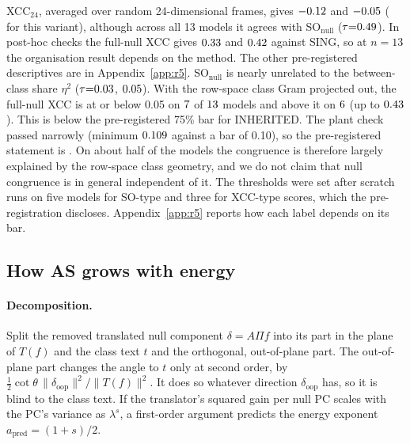 \documentclass[10pt]{article}
\begin{document}
XCC$_{24}$, averaged over random 24-dimensional frames, gives $-0.12$ and $-0.05$ (\FXCCLabel{} for this variant), although across all 13 models it agrees with SO$_{\mathrm{null}}$ ($\tau{=}0.49$). In post-hoc checks the full-null XCC gives $0.33$ and $0.42$ against SING, so at $n{=}13$ the organisation result depends on the method. The other pre-registered descriptives are in Appendix~\ref{app:r5}. SO$_{\mathrm{null}}$ is nearly unrelated to the between-class share $\eta^2$ ($\tau{=}0.03$, $0.05$). With the row-space class Gram projected out, the full-null XCC is at or below 0.05 on $7$ of $13$ models and above it on $6$ (up to $0.43$). This is below the pre-registered 75\% bar for INHERITED. The plant check passed narrowly (minimum $0.109$ against a bar of 0.10), so the pre-registered statement is \FInhStatement. On about half of the models the congruence is therefore largely explained by the row-space class geometry, and we do not claim that null congruence is in general independent of it.
The thresholds were set after scratch runs on five models for SO-type and three for XCC-type scores, which the pre-registration discloses. Appendix~\ref{app:r5} reports how each label depends on its bar.

\subsection{How AS grows with energy}
\label{sec:geom}\label{app:geom}
\paragraph{Decomposition.} Split the removed translated null component $\delta=A\Pi f$ into its part in the plane of $T(f)$ and the class text $t$ and the orthogonal, out-of-plane part.
The out-of-plane part changes the angle to $t$ only at second order, by $\tfrac12\cot\theta\,\|\delta_{\mathrm{oop}}\|^2/\|T(f)\|^2$. It does so whatever direction $\delta_{\mathrm{oop}}$ has, so it is blind to the class text.
If the translator's squared gain per null PC scales with the PC's variance as $\lambda^{s}$, a first-order argument predicts the energy exponent $a_{\mathrm{pred}}=(1+s)/2$.
\end{document}
